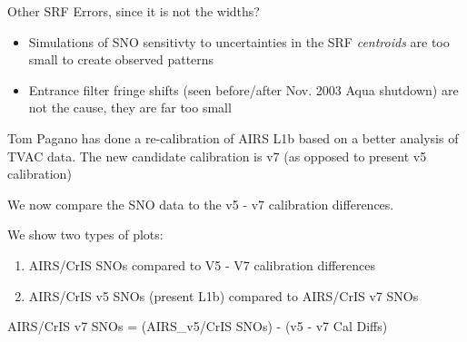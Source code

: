 \documentclass[10pt,t]{beamer}
\begin{document}
\begin{frame}[shrink=10,label={sec:org97f1f2a}]{Other SRF Errors, since it is not the widths?}
\vspace{-0.1in}
\begin{itemize}
\item Simulations of SNO sensitivty to uncertainties in the SRF \emph{centroids} are too small to create observed patterns

\item Entrance filter fringe shifts (seen before/after Nov. 2003 Aqua shutdown) are not the cause, they are far too small
\end{itemize}

Tom Pagano has done a re-calibration of AIRS L1b based on a better analysis of TVAC data.  The new candidate calibration is v7 (as opposed to present v5 calibration)

\vspace{0.1in}

We now compare the SNO data to the v5 - v7 calibration differences.

We show two types of plots:
\begin{enumerate}
\item AIRS/CrIS SNOs compared to V5 - V7 calibration differences
\item AIRS/CrIS v5 SNOs (present L1b) compared to AIRS/CrIS v7 SNOs
\end{enumerate}

\vspace{0.1in}

AIRS/CrIS v7 SNOs = (AIRS\_v5/CrIS SNOs) - (v5 - v7 Cal Diffs)
\end{frame}
\end{document}
